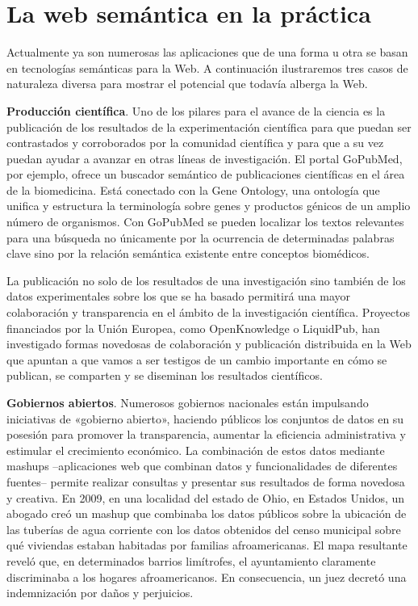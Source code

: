 


\section{La web semántica en la práctica}


Actualmente ya son numerosas las aplicaciones que de una forma u otra se basan en tecnologías semánticas para la Web. A continuación ilustraremos tres casos de naturaleza diversa para mostrar el potencial que todavía alberga la Web.

\textbf{Producción científica}. Uno de los pilares para el avance de la ciencia es la publicación de los resultados de la experimentación científica para que puedan ser contrastados y corroborados por la comunidad científica y para que a su vez puedan ayudar a avanzar en otras líneas de investigación. El portal GoPubMed, por ejemplo, ofrece un buscador semántico de publicaciones científicas en el área de la biomedicina. Está conectado con la Gene Ontology, una ontología que unifica y estructura la terminología sobre genes y productos génicos de un amplio número de organismos. Con GoPubMed se pueden localizar los textos relevantes para una búsqueda no únicamente por la ocurrencia de determinadas palabras clave sino por la relación semántica existente entre conceptos biomédicos. 

La publicación no solo de los resultados de una investigación sino también de los datos experimentales sobre los que se ha basado permitirá una mayor colaboración y transparencia en el ámbito de la investigación científica. Proyectos financiados por la Unión Europea, como OpenKnowledge o LiquidPub, han investigado formas novedosas de colaboración y publicación distribuida en la Web que apuntan a que vamos a ser testigos de un cambio importante en cómo se publican, se comparten y se diseminan los resultados científicos.

\textbf{Gobiernos abiertos}. Numerosos gobiernos nacionales están impulsando iniciativas de «gobierno abierto», haciendo públicos los conjuntos de datos en su posesión para promover la transparencia, aumentar la eficiencia administrativa y estimular el crecimiento económico. La combinación de estos datos mediante mashups –aplicaciones web que combinan datos y funcionalidades de diferentes fuentes– permite realizar consultas y presentar sus resultados de forma novedosa y creativa. En 2009, en una localidad del estado de Ohio, en Estados Unidos, un abogado creó un mashup que combinaba los datos públicos sobre la ubicación de las tuberías de agua corriente con los datos obtenidos del censo municipal sobre qué viviendas estaban habitadas por familias afroamericanas. El mapa resultante reveló que, en determinados barrios limítrofes, el ayuntamiento claramente discriminaba a los hogares afroamericanos. En consecuencia, un juez decretó una indemnización por daños y perjuicios.

